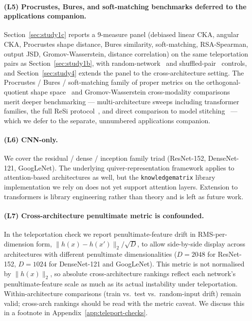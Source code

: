 \paragraph{(L5) Procrustes, Bures, and soft-matching benchmarks deferred to the applications companion.}
Section~\ref{sec:study1c} reports a 9-measure panel
(debiased linear CKA, angular CKA, Procrustes shape distance, Bures
similarity, soft-matching, RSA-Spearman, output JSD, Gromov-Wasserstein,
distance correlation) on the same teleportation pairs as
Section~\ref{sec:study1b}, with random-network~\citep{cui2022deconfounded}
and shuffled-pair~\citep{murphy2024debiased} controls, and
Section~\ref{sec:study4} extends the panel to the cross-architecture
setting.
The Procrustes / Bures / soft-matching family of proper metrics on the
orthogonal-quotient shape space~\citep{williams2021generalized,
harvey2023bures, khosla2024soft} and Gromov-Wasserstein
cross-modality comparisons~\citep{memoli2011gromov} merit deeper
benchmarking --- multi-architecture sweeps including transformer
families, the full ReSi protocol~\citep{klabunde2025resi}, and direct
comparison to model stitching~\citep{bansal2021revisiting} --- which we
defer to the separate, unnumbered applications companion.

\paragraph{(L6) CNN-only.}
We cover the residual / dense / inception family triad
(ResNet-152, DenseNet-121, GoogLeNet). The underlying
quiver-representation framework
\citep{armenta2021representation,armenta2022double} applies to
attention-based architectures as well, but the
\texttt{knowledgematrix} library implementation we rely on does not
yet support attention layers. Extension to transformers is library
engineering rather than theory and is left as future work.

\paragraph{(L7) Cross-architecture penultimate metric is confounded.}
In the teleportation check we report penultimate-feature drift in
RMS-per-dimension form, $\| h(x) - h(x') \|_2 / \sqrt{D}$, to
allow side-by-side display across architectures with different
penultimate dimensionalities ($D = 2048$ for ResNet-152, $D = 1024$
for DenseNet-121 and GoogLeNet). This metric is not normalised by
$\| h(x) \|_2$, so absolute cross-architecture rankings reflect
each network's penultimate-feature scale as much as its actual
instability under teleportation. Within-architecture comparisons
(train vs.\ test vs.\ random-input drift) remain valid; cross-arch
rankings should be read with the metric caveat. We discuss this in
a footnote in Appendix~\ref{app:teleport-checks}.

